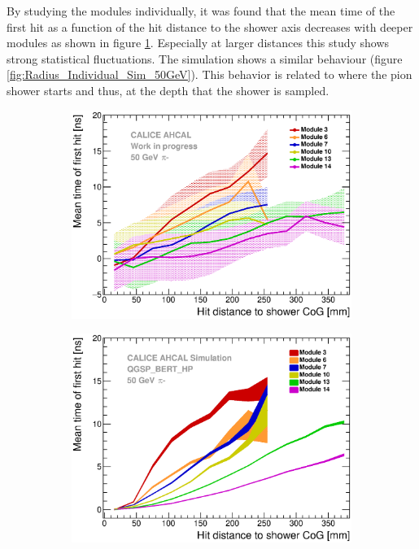 \documentclass{JINST}
\begin{document}
By studying the modules individually, it was found that the mean time of the first hit as a function of the hit distance to the shower axis decreases with deeper modules as shown in figure \ref{fig:Radius_Individual_Data_50GeV}. Especially at larger distances this study shows strong statistical fluctuations. The simulation shows a similar behaviour (figure \ref{fig:Radius_Individual_Sim_50GeV}). This behavior is related to where the pion shower starts and thus, at the depth that the shower is sampled.

\begin{figure}[htbp!]
  \begin{subfigure}[t]{0.49\textwidth}
    \centering
    \includegraphics[width=1\textwidth]{fig/Timing_Radius_Comparison_ShortAsymRange_IndividualLayers.eps}
    \caption{} \label{fig:Radius_Individual_Data_50GeV}
  \end{subfigure}
  \hfill
  \begin{subfigure}[t]{0.49\textwidth}
    \centering
    \includegraphics[width=1\textwidth]{fig/Timing_Radius_Comparison_ShortAsymRange_IndividualLayers_Sim.eps}

\end{subfigure}
\end{figure}
\end{document}
